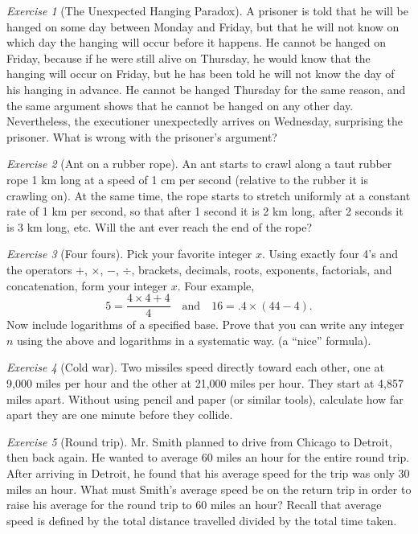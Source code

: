 \documentclass{article}
\theoremstyle{definition}
\theoremstyle{remark}
\newtheorem{exercise}{Exercise}
\begin{document}
    \begin{exercise}[The Unexpected Hanging Paradox]
        A prisoner is told that he will be hanged on some day between Monday and Friday, but that he will not know on which day the hanging will occur before it happens. He cannot be hanged on Friday, because if he were still alive on Thursday, he would know that the hanging will occur on Friday, but he has been told he will not know the day of his hanging in advance. He cannot be hanged Thursday for the same reason, and the same argument shows that he cannot be hanged on any other day. Nevertheless, the executioner unexpectedly arrives on Wednesday, surprising the prisoner. What is wrong with the prisoner's argument?
    \end{exercise}

    \begin{exercise}[Ant on a rubber rope]
        An ant starts to crawl along a taut rubber rope 1 km long at a speed of 1 cm per second (relative to the rubber it is crawling on). At the same time, the rope starts to stretch uniformly at a constant rate of 1 km per second, so that after 1 second it is 2 km long, after 2 seconds it is 3 km long, etc. Will the ant ever reach the end of the rope?
    \end{exercise}

    \begin{exercise}[Four fours]
        Pick your favorite integer \(x\). Using exactly four 4's and the operators \(+\), \(\times\), \(-\), \(\div\), brackets, decimals, roots, exponents, factorials, and concatenation, form your integer \(x\). Four example, 
        \[5 = \frac{4\times 4 + 4}{4}\quad\text{and}\quad 16 = .4\times (44-4).\]
        Now include logarithms of a specified base. Prove that you can write any integer \(n\) using the above and logarithms in a systematic way. (a ``nice'' formula).
    \end{exercise}
    
    \begin{exercise}[Cold war]
        Two missiles speed directly toward each other, one at 9,000 miles per hour and the other at 21,000 miles per hour. They start at 4,857 miles apart. Without using pencil and paper (or similar tools), calculate how far apart they are one minute before they collide.
    \end{exercise}
    
    \begin{exercise}[Round trip]
        Mr. Smith planned to drive from Chicago to Detroit, then back again. He wanted to average 60 miles an hour for the entire round trip. After arriving in Detroit, he found that his average speed for the trip was only 30 miles an hour. What must Smith's average speed be on the return trip in order to raise his average for the round trip to 60 miles an hour? Recall that average speed is defined by the total distance travelled divided by the total time taken.
    \end{exercise}
    
\end{document}
